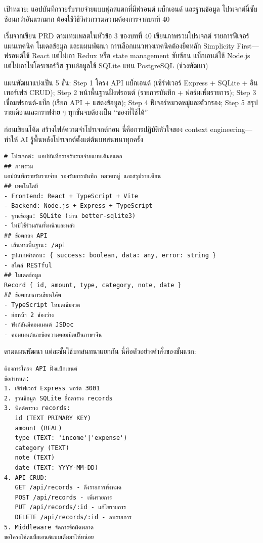 

เป้าหมาย: แอปบันทึกรายรับรายจ่ายแบบฟูลสแตกที่มีฟรอนต์ แบ็กเอนด์ และฐานข้อมูล โปรเจกต์นี้ซับซ้อนกว่าอันแรกมาก ต้องใช้วิธีวิศวกรรมความต้องการจากบทที่ 40

เริ่มจากเขียน PRD ตามเทมเพลตในหัวข้อ 3 ของบทที่ 40 เขียนภาพรวมโปรเจกต์ รายการฟีเจอร์ แผนเทคนิค โมเดลข้อมูล และแผนพัฒนา การเลือกแนวทางเทคนิคต้องยึดหลัก Simplicity First—ฟรอนต์ใช้ React แต่ไม่เอา Redux หรือ state management ซับซ้อน แบ็กเอนด์ใช้ Node.js แต่ไม่เอาไมโครเซอร์วิส ฐานข้อมูลใช้ SQLite แทน PostgreSQL (ช่วงพัฒนา)

แผนพัฒนาแบ่งเป็น 5 ขั้น: Step 1 โครง API แบ็กเอนด์ (เซิร์ฟเวอร์ Express + SQLite + อินเทอร์เฟซ CRUD); Step 2 หน้าพื้นฐานฝั่งฟรอนต์ (รายการบันทึก + ฟอร์มเพิ่มรายการ); Step 3 เชื่อมฟรอนต์-แบ็ก (เรียก API + แสดงข้อมูล); Step 4 ฟีเจอร์หมวดหมู่และตัวกรอง; Step 5 สรุปรายเดือนและกราฟง่าย ๆ ทุกขั้นจบต้องเป็น “ของที่ใช้ได้”


ก่อนเขียนโค้ด สร้างไฟล์ความจำโปรเจกต์ก่อน นี่คือการปฏิบัติหัวใจของ context engineering—ทำให้ AI รู้พื้นหลังโปรเจกต์ตั้งแต่ต้นบทสนทนาทุกครั้ง

\begin{lstlisting}
# โปรเจกต์: แอปบันทึกรายรับรายจ่ายแบบเต็มสแตก
## ภาพรวม
แอปบันทึกรายรับรายจ่าย รองรับการบันทึก หมวดหมู่ และสรุปรายเดือน
## เทคโนโลยี
- Frontend: React + TypeScript + Vite
- Backend: Node.js + Express + TypeScript
- ฐานข้อมูล: SQLite (ผ่าน better-sqlite3)
- ไทป์ใช้ร่วมกันทั้งหน้าและหลัง
## ข้อตกลง API
- เส้นทางพื้นฐาน: /api
- รูปแบบคำตอบ: { success: boolean, data: any, error: string }
- สไตล์ RESTful
## โมเดลข้อมูล
Record { id, amount, type, category, note, date }
## ข้อตกลงการเขียนโค้ด
- TypeScript โหมดเข้มงวด
- ย่อหน้า 2 ช่องว่าง
- ฟังก์ชันมีคอมเมนต์ JSDoc
- คอมเมนต์และข้อความคอมมิตเป็นภาษาจีน
\end{lstlisting}


ตามแผนพัฒนา แต่ละขั้นใช้บทสนทนาแยกกัน นี่คือตัวอย่างคำสั่งของขั้นแรก:

\begin{lstlisting}
ต้องการโครง API ฝั่งแบ็กเอนด์
ข้อกำหนด:
1. เซิร์ฟเวอร์ Express พอร์ต 3001
2. ฐานข้อมูล SQLite ชื่อตาราง records
3. ฟิลด์ตาราง records:
   id (TEXT PRIMARY KEY)
   amount (REAL)
   type (TEXT: 'income'|'expense')
   category (TEXT)
   note (TEXT)
   date (TEXT: YYYY-MM-DD)
4. API CRUD:
   GET /api/records - ดึงรายการทั้งหมด
   POST /api/records - เพิ่มรายการ
   PUT /api/records/:id - แก้ไขรายการ
   DELETE /api/records/:id - ลบรายการ
5. Middleware จัดการข้อผิดพลาด
ขอโครงโค้ดแบ็กเอนด์แบบเต็มมาให้หน่อย
\end{lstlisting}

